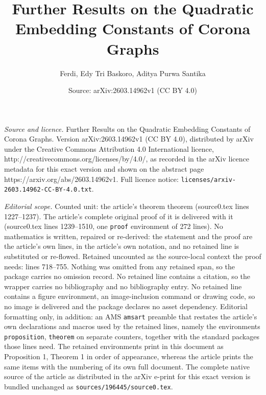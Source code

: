 \documentclass[10pt,a4paper]{amsart}
\title{Further Results on the Quadratic Embedding Constants of Corona Graphs}
\author{Ferdi, Edy Tri Baskoro, Aditya Purwa Santika}
\date{Source: arXiv:2603.14962v1 (CC BY 4.0)}
\begin{document}
\maketitle

\noindent\emph{Source and licence.} Further Results on the Quadratic Embedding Constants of Corona Graphs. Version arXiv:2603.14962v1 (CC BY 4.0), distributed by arXiv under the Creative Commons Attribution 4.0 International licence, http://creativecommons.org/licenses/by/4.0/, as recorded in the arXiv licence metadata for this exact version and shown on the abstract page https://arxiv.org/abs/2603.14962v1. Full licence notice: \texttt{licenses/arxiv-2603.14962-CC-BY-4.0.txt}.\par\smallskip

\noindent\textit{Editorial scope.} Counted unit: the article's theorem theorem (source0.tex lines 1227--1237). The article's complete original proof of it is delivered with it (source0.tex lines 1239--1510, one \texttt{proof} environment of 272 lines). No mathematics is written, repaired or re-derived: the statement and the proof are the article's own lines, in the article's own notation, and no retained line is substituted or re-flowed.  Retained uncounted as the source-local context the proof needs: lines 718--755.  Nothing was omitted from any retained span, so the package carries no omission record.  No retained line contains a citation, so the wrapper carries no bibliography and no bibliography entry.  No retained line contains a figure environment, an image-inclusion command or drawing code, so no image is delivered and the package declares no asset dependency.  Editorial formatting only, in addition: an AMS \texttt{amsart} preamble that restates the article's own declarations and macros used by the retained lines, namely the environments \texttt{proposition}, \texttt{theorem} on separate counters, together with the standard packages those lines need.  The retained environments print in this document as Proposition 1, Theorem 1 in order of appearance, whereas the article prints the same items with the numbering of its own full document.  The complete native source of the article as distributed in the arXiv e-print for this exact version is bundled unchanged as \texttt{sources/196445/source0.tex}.
\end{document}
